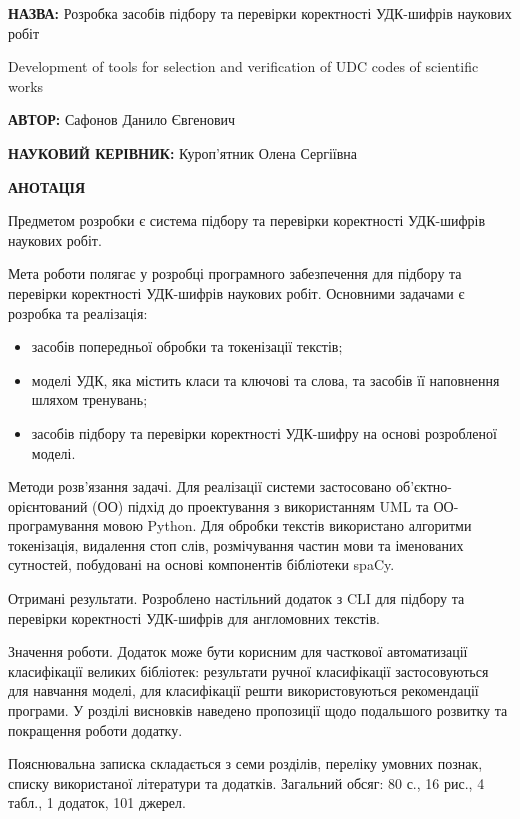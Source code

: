 \documentclass[14pt]{extarticle}
\begin{document}
\noindent
\textbf{НАЗВА:} Розробка засобів підбору та перевірки коректності
УДК-шифрів наукових робіт

\noindent
Development of tools for selection and
verification of UDC codes of scientific works

\vspace{\baselineskip}

\noindent
\textbf{АВТОР:} Сафонов Данило Євгенович

\noindent
\textbf{НАУКОВИЙ КЕРІВНИК:} Куроп'ятник Олена Сергіївна

\vspace{\baselineskip}

\noindent
\textbf{АНОТАЦІЯ}

Предметом розробки є система підбору та перевірки коректності
УДК-шифрів наукових робіт.

Мета роботи полягає у розробці програмного забезпечення
для підбору та перевірки коректності УДК-шифрів наукових робіт.
Основними задачами є розробка та реалізація:
\begin{itemize}[itemsep=1pt,labelindent=\dimexpr{}\relax, leftmargin=*]
  \item засобів попередньої обробки та токенізації текстів;
  \item моделі УДК, яка містить класи та ключові та слова, та засобів її наповнення шляхом тренувань;
  \item засобів підбору та перевірки коректності УДК-шифру на основі розробленої моделі.
\end{itemize}

Методи розв’язання задачі.
Для реалізації системи застосовано об’єктно-орієнтований (ОО)
підхід до проектування з використанням UML та ОО-програмування мовою Python.
Для обробки текстів використано алгоритми токенізація, видалення стоп слів,
розмічування частин мови та іменованих сутностей,
побудовані на основі компонентів бібліотеки spaCy.

Отримані результати.
Розроблено настільний додаток з CLI для підбору та перевірки коректності
УДК-шифрів для англомовних текстів.

Значення роботи. Додаток може бути корисним для часткової
автоматизації класифікації великих бібліотек: результати ручної класифікації
застосовуються для навчання моделі, для класифікації решти використовуються
рекомендації програми. У розділі висновків наведено пропозиції щодо
подальшого розвитку та покращення роботи додатку.

Пояснювальна записка складається з семи розділів, переліку умовних познак,
списку використаної літератури та додатків.
Загальний обсяг: 80 с., 16 рис., 4 табл., 1 додаток, 101 джерел.
\end{document}
